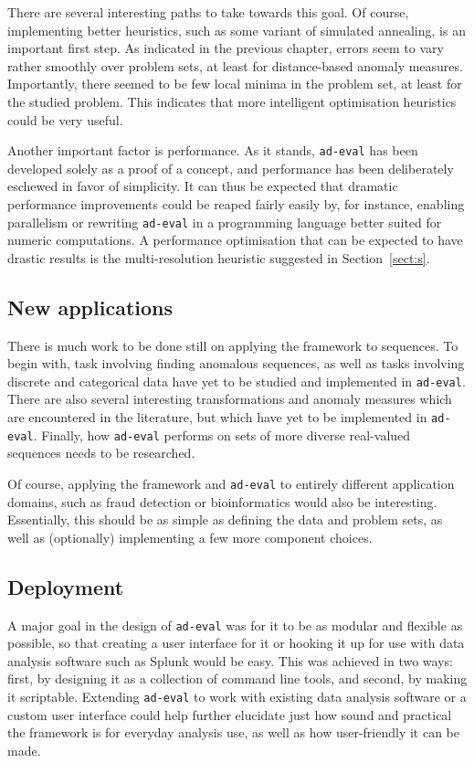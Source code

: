There are several interesting paths to take towards this goal. Of course, implementing better heuristics, such as some variant of simulated annealing, is an important first step. As indicated in the previous chapter, errors seem to vary rather smoothly over problem sets, at least for distance-based anomaly measures. Importantly, there seemed to be few local minima in the problem set, at least for the studied problem. This indicates that more intelligent optimisation heuristics could be very useful.

Another important factor is performance. As it stands, \texttt{ad-eval} has been developed solely as a proof of a concept, and performance has been deliberately eschewed in favor of simplicity. It can thus be expected that dramatic performance improvements could be reaped fairly easily by, for instance, enabling parallelism or rewriting \texttt{ad-eval} in a programming language better suited for numeric computations. A performance optimisation that can be expected to have drastic results is the multi-resolution heuristic suggested in Section~\ref{sect:s}.

\subsection{New applications}
There is much work to be done still on applying the framework to sequences. To begin with, task involving finding anomalous sequences, as well as tasks involving discrete and categorical data have yet to be studied and implemented in \texttt{ad-eval}. There are also several interesting transformations and anomaly measures which are encountered in the literature, but which have yet to be implemented in \texttt{ad-eval}. Finally, how \texttt{ad-eval} performs on sets of more diverse real-valued sequences needs to be researched.

Of course, applying the framework and \texttt{ad-eval} to entirely different application domains, such as fraud detection or bioinformatics would also be interesting. Essentially, this should be as simple as defining the data and problem sets, as well as (optionally) implementing a few more component choices.

\subsection{Deployment}
A major goal in the design of \texttt{ad-eval} was for it to be as modular and flexible as possible, so that creating a user interface for it or hooking it up for use with data analysis software such as Splunk would be easy. This was achieved in two ways: first, by designing it as a collection of command line tools, and second, by making it scriptable. Extending \texttt{ad-eval} to work with existing data analysis software or a custom user interface could help further elucidate just how sound and practical the framework is for everyday analysis use, as well as how user-friendly it can be made.

